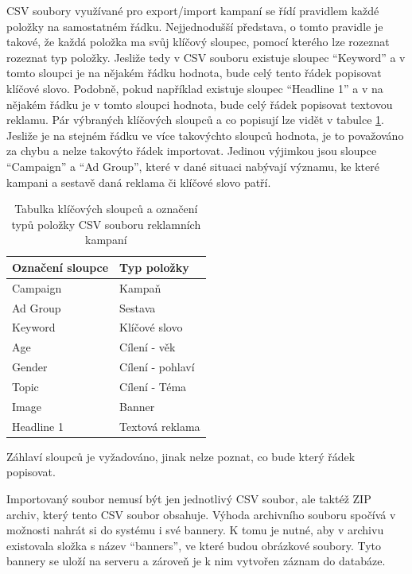 CSV soubory využívané pro export/import kampaní se řídí pravidlem každé položky na samostatném řádku. Nejjednodušší představa, o tomto pravidle je takové, že
každá položka ma svůj klíčový sloupec, pomocí kterého lze rozeznat rozeznat typ položky. Jesliže tedy v CSV souboru existuje sloupec \enquote{Keyword} a v tomto sloupci je
na nějakém řádku hodnota, bude celý tento řádek popisovat klíčové slovo. Podobně, pokud například existuje sloupec \enquote{Headline 1} a v na nějakém řádku 
je v tomto sloupci hodnota, bude celý řádek popisovat textovou reklamu. Pár výbraných klíčových sloupců a co popisují lze vidět v tabulce \ref{tab:csv-columns}.
Jesliže je na stejném řádku ve více takovýchto sloupců hodnota, je to považováno za chybu a nelze takovýto řádek importovat. Jedinou výjimkou jsou sloupce
\enquote{Campaign} a \enquote{Ad Group}, které v dané situaci nabývají významu, ke které kampani a sestavě daná reklama či klíčové slovo patří.

\begin{table}[h]
    \centering
    \begin{tabular}{ |l|l| }
        \hline
        Označení sloupce & Typ položky \\
        \hline
        Campaign & Kampaň \\
        Ad Group & Sestava \\
        Keyword & Klíčové slovo \\
        Age & Cílení - věk \\
        Gender & Cílení - pohlaví \\
        Topic & Cílení - Téma \\
        Image & Banner \\
        Headline 1 & Textová reklama \\
        \hline
    \end{tabular}
    \caption{Tabulka klíčových sloupců a označení typů položky CSV souboru reklamních kampaní}
    \label{tab:csv-columns}
\end{table}

Záhlaví sloupců je vyžadováno, jinak nelze poznat, co bude který řádek popisovat.

Importovaný soubor nemusí být jen jednotlivý CSV soubor, ale taktéž ZIP archiv, který tento CSV soubor obsahuje.
Výhoda archivního souboru spočívá v možnosti nahrát si do systému i své bannery. K tomu je nutné, aby
v archivu existovala složka s název \enquote{banners}, ve které budou obrázkové soubory. Tyto bannery se uloží na serveru a zároveň je k nim vytvořen záznam do databáze.

